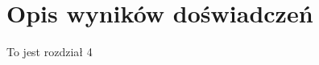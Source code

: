 \documentclass[document.tex]{subfiles}
\begin{document}
\chapter{Opis wyników doświadczeń}
To jest rozdział 4
\end{document}
